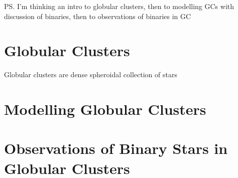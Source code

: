 \ps{I'm thinking an intro to globular clusters, then to modelling GCs with discussion of binaries,
	then to observations of binaries in GC}

\section{Globular Clusters}

Globular clusters are dense spheroidal collection of stars





\section{Modelling Globular Clusters}

\section{Observations of Binary Stars in Globular Clusters}

